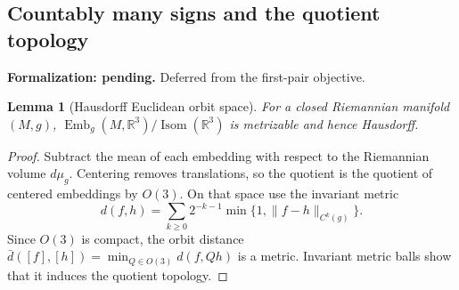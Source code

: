 \documentclass[11pt]{amsart}
\newtheorem{lemma}[theorem]{Lemma}
\theoremstyle{definition}
\theoremstyle{remark}
\newcommand{\R}{\mathbb R}\newcommand{\Sph}{\mathbb S}
\DeclareMathOperator{\Isom}{Isom}\DeclareMathOperator{\Emb}{Emb}
\numberwithin{equation}{section}
\begin{document}
\subsection{Countably many signs and the quotient topology}
\par\noindent\textbf{Formalization: pending.} Deferred from the first-pair objective.\par
\begin{lemma}[Hausdorff Euclidean orbit space]\label{lem:orbit-space}
For a closed Riemannian manifold $(M,g)$,
$\Emb_g(M,\R^3)/\Isom(\R^3)$ is metrizable and hence Hausdorff.
\end{lemma}
\begin{proof}
Subtract the mean of each embedding with respect to the Riemannian
volume $d\mu_g$. Centering removes
translations, so the quotient is the quotient of centered embeddings by
$O(3)$. On that space use the invariant metric
\[
 d(f,h)=\sum_{k\ge0}2^{-k-1}\min\{1,\|f-h\|_{C^k(g)}\}.
\]
Since $O(3)$ is compact, the orbit distance
$\bar d([f],[h])=\min_{Q\in O(3)}d(f,Qh)$ is a metric. Invariant metric
balls show that it induces the quotient topology.
\end{proof}
\end{document}

